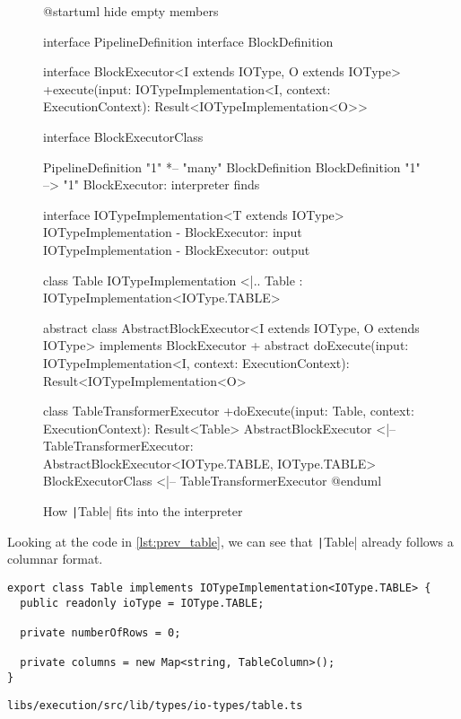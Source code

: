 \begin{figure}
	\begin{plantuml}
		@startuml
		hide empty members

		interface PipelineDefinition
		interface BlockDefinition

		interface BlockExecutor<I extends IOType, O extends IOType> {
				+execute(input: IOTypeImplementation<I\>, context: ExecutionContext): Result<IOTypeImplementation<O>>
			}

		interface BlockExecutorClass {}

		PipelineDefinition "1" *-- "many" BlockDefinition
		BlockDefinition "1" --> "1" BlockExecutor: interpreter finds

		interface IOTypeImplementation<T extends IOType>
		IOTypeImplementation - BlockExecutor: input
		IOTypeImplementation - BlockExecutor: output

		class Table
		IOTypeImplementation <|.. Table : IOTypeImplementation<IOType.TABLE>

		abstract class AbstractBlockExecutor<I extends IOType, O extends IOType> implements BlockExecutor {
		+ {abstract} doExecute(input: IOTypeImplementation<I\>, context: ExecutionContext): Result<IOTypeImplementation<O\>>
		}

		class TableTransformerExecutor {
				+doExecute(input: Table, context: ExecutionContext): Result<Table>
			}
		AbstractBlockExecutor <|-- TableTransformerExecutor: AbstractBlockExecutor<IOType.TABLE, IOType.TABLE>
		BlockExecutorClass <|-- TableTransformerExecutor
		@enduml
	\end{plantuml}
	\caption{How \texttt|Table| fits into the interpreter} %
	\label{fig:prev_sit}
\end{figure}

Looking at the code in \ref{lst:prev_table}, we can see that \texttt|Table| already follows a columnar format.
\begin{listing}
	\begin{verbatim}
export class Table implements IOTypeImplementation<IOType.TABLE> {
  public readonly ioType = IOType.TABLE;

  private numberOfRows = 0;

  private columns = new Map<string, TableColumn>();
}
	\end{verbatim}
	\caption{\texttt{libs/execution/src/lib/types/io-types/table.ts}} %
	\label{lst:prev_table}
\end{listing}

